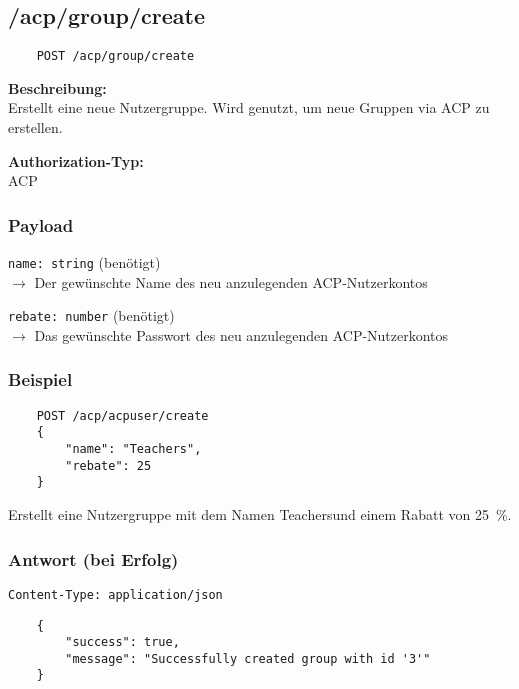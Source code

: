 \subsection{/acp/group/create}

\begin{lstlisting}
    POST /acp/group/create
\end{lstlisting}

\textbf{Beschreibung:} \\
Erstellt eine neue Nutzergruppe. Wird genutzt, um neue Gruppen via ACP zu erstellen.

\textbf{Authorization-Typ:} \\
ACP

\subsubsection{Payload}

\lstinline{name: string} (benötigt) \\
$\rightarrow$ Der gewünschte Name des neu anzulegenden ACP-Nutzerkontos

\lstinline{rebate: number} (benötigt) \\
$\rightarrow$ Das gewünschte Passwort des neu anzulegenden ACP-Nutzerkontos

\subsubsection{Beispiel}

\begin{lstlisting}
    POST /acp/acpuser/create
    {
        "name": "Teachers",
        "rebate": 25
    }
\end{lstlisting}

Erstellt eine Nutzergruppe mit dem Namen \glqq Teachers\grqq\space und einem Rabatt von \SI{25}{\percent}.

\subsubsection{Antwort (bei Erfolg)}

\lstinline{Content-Type: application/json}
\begin{lstlisting}
    {
        "success": true, 
        "message": "Successfully created group with id '3'"
    }
\end{lstlisting}